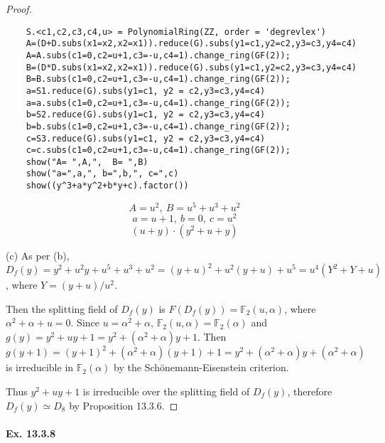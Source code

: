 \documentclass[11pt,a4paper]{article}
\begin{document}
{\begin{proof}
\begin{verbatim}
    S.<c1,c2,c3,c4,u> = PolynomialRing(ZZ, order = 'degrevlex')
    A=(D+D.subs(x1=x2,x2=x1)).reduce(G).subs(y1=c1,y2=c2,y3=c3,y4=c4)
    A=A.subs(c1=0,c2=u+1,c3=-u,c4=1).change_ring(GF(2));
    B=(D*D.subs(x1=x2,x2=x1)).reduce(G).subs(y1=c1,y2=c2,y3=c3,y4=c4)
    B=B.subs(c1=0,c2=u+1,c3=-u,c4=1).change_ring(GF(2));
    a=S1.reduce(G).subs(y1=c1, y2 = c2,y3=c3,y4=c4)
    a=a.subs(c1=0,c2=u+1,c3=-u,c4=1).change_ring(GF(2));
    b=S2.reduce(G).subs(y1=c1, y2 = c2,y3=c3,y4=c4)
    b=b.subs(c1=0,c2=u+1,c3=-u,c4=1).change_ring(GF(2));
    c=S3.reduce(G).subs(y1=c1, y2 = c2,y3=c3,y4=c4)
    c=c.subs(c1=0,c2=u+1,c3=-u,c4=1).change_ring(GF(2));
    show("A= ",A,",  B= ",B)
    show("a=",a,", b=",b,", c=",c)
    show((y^3+a*y^2+b*y+c).factor())
\end{verbatim}
$$A= u^{2},~ B=u^{5} + u^{3} + u^{2}$$
$$a= u + 1,~b= 0,~ c= u^{2}$$
$$(u + y) \cdot (y^{2} + u + y)$$
\item[(c)] As per (b), $D_f(y)=y^2+u^2y+u^5+u^3+u^2=(y+u)^2+u^2(y+u)+u^5=u^4(Y^2+Y+u)$, where $Y=({y+u})/{u^2}$.

Then the splitting field of $D_f(y)$ is $F(D_f(y))=\mathbb{F}_2(u,\alpha)$, where $\alpha^2+\alpha+u=0$. Since $u=\alpha^2+\alpha$, $\mathbb{F}_2(u,\alpha)=\mathbb{F}_2(\alpha)$ and $g(y)=y^2+uy+1=y^2+(\alpha^2+\alpha)y+1$. Then $g(y+1)=(y+1)^2+(\alpha^2+\alpha)(y+1)+1=y^2+(\alpha^2+\alpha)y+(\alpha^2+\alpha)$ is irreducible in $\mathbb{F}_2(\alpha)$ by the Sch\"onemann-Eisenstein criterion.


Thus $y^2+uy+1$ is irreducible over the splitting field of $D_f(y)$, therefore $D_f(y)\simeq D_8$ by Proposition 13.3.6.
\end{proof}
}

\paragraph{Ex. 13.3.8}
\end{document}
